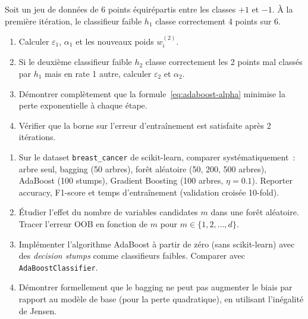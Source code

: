 \begin{exercice}
Soit un jeu de donn\'ees de 6 points \'equir\'epartis entre les classes
$+1$ et $-1$. \`A la premi\`ere it\'eration, le classifieur faible $h_1$
classe correctement 4 points sur 6.
\begin{enumerate}
  \item Calculer $\varepsilon_1$, $\alpha_1$ et les nouveaux poids $w_i^{(2)}$.
  \item Si le deuxi\`eme classifieur faible $h_2$ classe correctement les 2
    points mal class\'es par $h_1$ mais en rate 1 autre, calculer
    $\varepsilon_2$ et $\alpha_2$.
  \item D\'emontrer compl\`etement que la formule~\eqref{eq:adaboost-alpha}
    minimise la perte exponentielle \`a chaque \'etape.
  \item V\'erifier que la borne sur l'erreur d'entra\^inement est
    satisfaite apr\`es 2 it\'erations.
\end{enumerate}
\end{exercice}

\begin{exercice}
\begin{enumerate}
  \item Sur le dataset \texttt{breast\_cancer} de scikit-learn, comparer
    syst\'ematiquement~: arbre seul, bagging (50 arbres), for\^et al\'eatoire
    (50, 200, 500 arbres), AdaBoost (100 stumps), Gradient Boosting
    (100 arbres, $\eta = 0.1$). Reporter accuracy, F1-score et temps
    d'entra\^inement (validation crois\'ee 10-fold).
  \item \'Etudier l'effet du nombre de variables candidates $m$ dans une
    for\^et al\'eatoire. Tracer l'erreur OOB en fonction de $m$ pour
    $m \in \{1, 2, \ldots, d\}$.
  \item Impl\'ementer l'algorithme AdaBoost \`a partir de z\'ero (sans
    scikit-learn) avec des \emph{decision stumps} comme classifieurs faibles.
    Comparer avec \texttt{AdaBoostClassifier}.
  \item D\'emontrer formellement que le bagging ne peut pas augmenter le biais
    par rapport au mod\`ele de base (pour la perte quadratique), en utilisant
    l'in\'egalit\'e de Jensen.
\end{enumerate}
\end{exercice}
